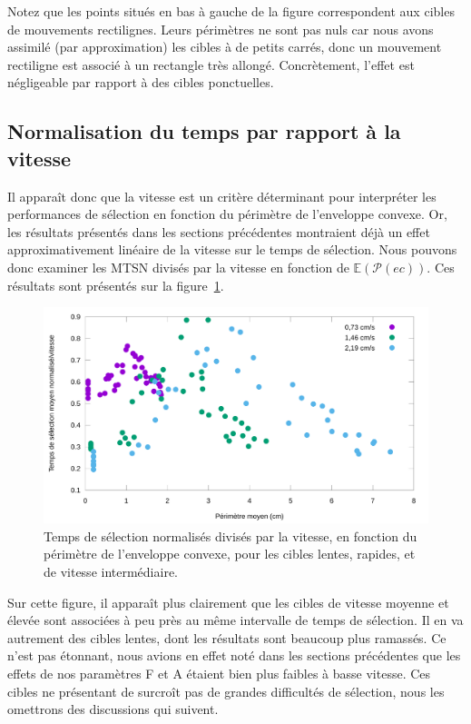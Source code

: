 	Notez que les points situés en bas à gauche de la figure correspondent aux cibles de mouvements rectilignes. Leurs périmètres ne sont pas nuls car nous avons assimilé (par approximation) les cibles à de petits carrés, donc un mouvement rectiligne est associé à un rectangle très allongé. Concrètement, l'effet est négligeable par rapport à des cibles ponctuelles.
	
	\subsection{Normalisation du temps par rapport à la vitesse}
	Il apparaît donc que la vitesse est un critère déterminant pour interpréter les performances de sélection en fonction du périmètre de l'enveloppe convexe. Or, les résultats présentés dans les sections précédentes montraient déjà un effet approximativement linéaire de la vitesse sur le temps de sélection. Nous pouvons donc examiner les MTSN divisés par la vitesse en fonction de $\mathbb{E}(\mathcal{P}(ec))$. Ces résultats sont présentés sur la figure~\ref{fig:perfVareaTimeNormedAll}.
	
	\begin{figure}[!htb]
		\centering
		\includegraphics[width=\textwidth]{figures/ch4/perfVareaTimeNormedAll}
		\caption[Temps de sélection/V en fonction du périmètre de l'enveloppe convexe]{Temps de sélection normalisés divisés par la vitesse, en fonction du périmètre de l'enveloppe convexe, pour les cibles lentes, rapides, et de vitesse intermédiaire.}
		\label{fig:perfVareaTimeNormedAll}
	\end{figure}
	
	Sur cette figure, il apparaît plus clairement que les cibles de vitesse moyenne et élevée sont associées à peu près au même intervalle de temps de sélection. Il en va autrement des cibles lentes, dont les résultats sont beaucoup plus ramassés. Ce n'est pas étonnant, nous avions en effet noté dans les sections précédentes que les effets de nos paramètres F et A étaient bien plus faibles à basse vitesse. Ces cibles ne présentant de surcroît pas de grandes difficultés de sélection, nous les omettrons des discussions qui suivent.
	
